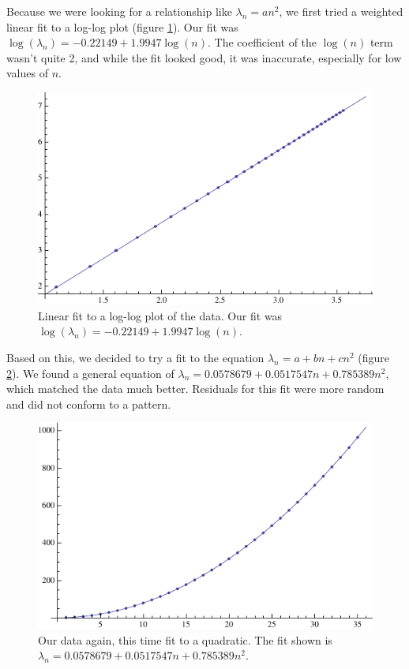 \documentclass[12pt,twoside]{reedthesis}
\begin{document}
Because we were looking for a relationship like $\lambda_n = a n^2$, we first tried a weighted linear fit to a log-log plot (figure \ref{fig:loglog}). Our fit was $\log(\lambda_n) = -0.22149 + 1.9947 \log(n)$. The coefficient of the $\log(n)$ term wasn't quite 2, and while the fit looked good, it was inaccurate, especially for low values of $n$. 
\begin{figure}[h]
\centering
\includegraphics{Figures/loglog}
\caption[Log-log fit]{Linear fit to a log-log plot of the data. Our fit was $\log(\lambda_n) = -0.22149 + 1.9947 \log(n)$.}
\label{fig:loglog}
\end{figure}

Based on this, we decided to try a fit to the equation $\lambda_n = a + b n + c n^2$ (figure \ref{fig:quadfit}). We found a general equation of $\lambda_n = 0.0578679 + 0.0517547 n + 0.785389 n^2$, which matched the data much better. Residuals for this fit were more random and did not conform to a pattern.
\begin{figure}[h]
\centering
\includegraphics{Figures/quadfit}
\caption[Quadratic fit]{Our data again, this time fit to a quadratic. The fit shown is $\lambda_n = 0.0578679 + 0.0517547 n + 0.785389 n^2$.}
\label{fig:quadfit}
\end{figure}
\end{document}
